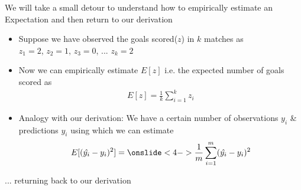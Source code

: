 				
\begin{frame}
	\begin{block}{}
		We will take a small detour to understand how to empirically estimate an Expectation and then return to our derivation
	\end{block}
\end{frame}
\begin{frame}
	\begin{itemize}
		\justifying
		\setlength\itemsep{1em}
		\item<1-> Suppose we have observed the goals scored($z$) in $k$ matches as \\$z_1=2$, $z_2=1$, $z_3=0$, ... $z_k=2$
		\item<2-> Now we can empirically estimate $E[z]$ i.e. the expected number of goals scored as
		\begin{align*}
			E[z]=\frac{1}{k}\sum_{i=1}^{k}z_i 
		\end{align*}
		\item<3-> Analogy with our derivation: We have a certain number of observations $y_i$ \& predictions $\hat{y_i}$ using which we can estimate
		\begin{align*}
			E[(\hat{y_i}-y_i)^2]= \onslide<4->{\frac{1}{m}\sum_{i=1}^{m}(\hat{y_i}-y_i)^2} 
		\end{align*}
	\end{itemize}
		
\end{frame}
\begin{frame}
	\begin{block}{}
		... returning back to our derivation
	\end{block}
\end{frame}
